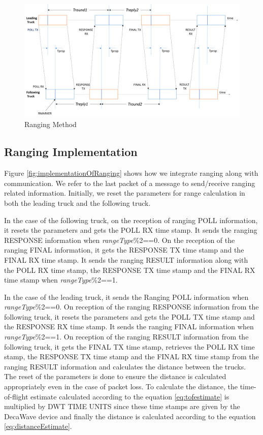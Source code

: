 \begin{figure}[h!]
    \includegraphics[width=1\textwidth]{figures/RangingMethod}
    \centering
    \caption{Ranging Method}
    \label{fig:rangingMethod}    
\end{figure}

\subsection{Ranging Implementation}
Figure \ref{fig:implementationOfRanging} shows how we integrate ranging along with communication. We refer to the last packet of a message to send/receive ranging related information. Initially, we reset the parameters for range calculation in both the leading truck and the following truck. 

In the case of the following truck, on the reception of ranging POLL information, it resets the parameters and gets the POLL RX time stamp. It sends the ranging RESPONSE information when \emph{rangeType}\%2==0. On the reception of the ranging FINAL information, it gets the RESPONSE TX time stamp and the FINAL RX time stamp. It sends the ranging RESULT information along with the POLL RX time stamp, the RESPONSE TX time stamp and the FINAL RX time stamp when \emph{rangeType}\%2==1.

In the case of the leading truck, it sends the Ranging POLL information when \emph{rangeType}\%2==0. On reception of the ranging RESPONSE information from the following truck, it resets the parameters and gets the POLL TX time stamp and the RESPONSE RX time stamp. It sends the ranging FINAL information when \emph{rangeType}\%2==1. On reception of the ranging RESULT information from the following truck, it gets the FINAL TX time stamp, retrieves the POLL RX time stamp, the RESPONSE TX time stamp and the FINAL RX time stamp from the ranging RESULT information and calculates the distance between the trucks. The reset of the parameters is done to ensure the distance is calculated appropriately even in the case of packet loss. To calculate the distance, the time-of-flight estimate calculated according to the equation \ref{eq:tofestimate} is multiplied by DWT TIME UNITS since these time stamps are given by the DecaWave device and finally the distance is calculated according to the equation \ref{eq:distanceEstimate}.
   
